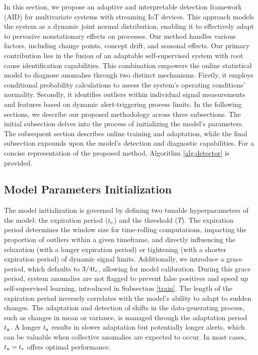 In this section, we propose an adaptive and interpretable detection framework (AID) for multivariate systems with streaming IoT devices. This approach models the system as a dynamic joint normal distribution, enabling it to effectively adapt to pervasive nonstationary effects on processes. Our method handles various factors, including change points, concept drift, and seasonal effects. Our primary contribution lies in the fusion of an adaptable self-supervised system with root cause identification capabilities. This combination empowers the online statistical model to diagnose anomalies through two distinct mechanisms. Firstly, it employs conditional probability calculations to assess the system's operating conditions' normality. Secondly, it identifies outliers within individual signal measurements and features based on dynamic alert-triggering process limits. In the following sections, we describe our proposed methodology across three subsections. The initial subsection delves into the process of initializing the model's parameters. The subsequent section describes online training and adaptation, while the final subsection expounds upon the model's detection and diagnostic capabilities. For a concise representation of the proposed method, Algorithm \ref{alg:detector} is provided.

\subsection{Model Parameters Initialization}\label{init}
The model initialization is governed by defining two tunable hyperparameters of the model: the expiration period ($t _{\text{e}}$) and the threshold ($T$). The expiration period determines the window size for time-rolling computations, impacting the proportion of outliers within a given timeframe, and directly influencing the relaxation (with a longer expiration period) or tightening (with a shorter expiration period) of dynamic signal limits. Additionally, we introduce a grace period, which defaults to $3/4 t _{\text{e}}$, allowing for model calibration. During this grace period, system anomalies are not flagged to prevent false positives and speed up self-supervised learning, introduced in Subsection \ref{train}. The length of the expiration period inversely correlates with the model's ability to adapt to sudden changes. The adaptation and detection of shifts in the data-generating process, such as changes in mean or variance, is managed through the adaptation period $t _{\text{a}}$. A longer $t _{\text{a}}$ results in slower adaptation but potentially longer alerts, which can be valuable when collective anomalies are expected to occur. In most cases, $t _{\text{a}} = t _{\text{e}}$ offers optimal performance.


